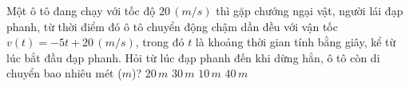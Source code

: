 \begin{ex}%
    Một ô tô đang chạy với tốc độ $20\,\left(m/s \right)$ thì gặp chướng ngại vật, người lái đạp phanh, từ thời điểm đó ô tô chuyển động chậm dần đều với vận tốc $v\left(t \right)=-5t+20\,\left(m/s \right)$, trong đó $t$ là khoảng thời gian tính bằng giây, kể từ lúc bắt đầu đạp phanh. Hỏi từ lúc đạp phanh đến khi dừng hẳn, ô tô còn di chuyển bao nhiêu mét ($m$)?
    \choice
    {$20\,m$}
    {$30\,m$}
    {$10\,m$}
    {\True $40\,m$}
\end{ex}


